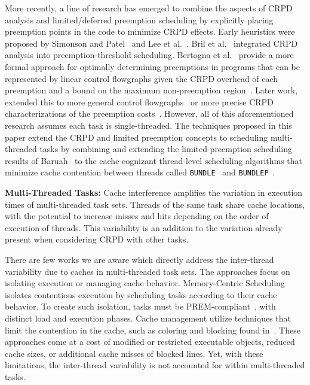 \documentclass[a4paper,UKenglish,cleveref,autoref,english]{lipics-v2019}
\newcommand{\bundlep}{\texttt{BUNDLEP}}
\newcommand{\bundle}{\texttt{BUNDLE}}
\begin{document}
More recently, a line of research has emerged to combine the aspects
of CRPD analysis and limited/deferred preemption scheduling by
explicitly placing preemption points in the code to minimize CRPD
effects.  Early heuristics were proposed by Simonson and
Patel~\cite{Simonson:1995} and Lee et al.~\cite{Lee:1998}.  Bril et
al.~\cite{Bril:2017} integrated CRPD analysis into preemption-threshold
scheduling.  Bertogna et al.~\cite{Bertogna:2011} provide a more formal
approach for optimally determining preemptions in programs that can be
represented by linear control flowgraphs given the CRPD overhead of
each preemption and a bound on the maximum non-preemption
region~\cite{Baruah:2005}. Later work, extended this to more general
control flowgraphs~\cite{Peng:2014} or more precise CRPD
characterizations of the preemption costs~\cite{Cavicchio:2015}.
However, all of this aforementioned research assumes each task is
single-threaded.  The techniques proposed in this paper extend
the CRPD and limited preemption concepts to scheduling multi-threaded
tasks by combining and extending the limited-preemption scheduling
results of Baruah~\cite{Baruah:2005} to the cache-cognizant
thread-level scheduling algorithms that minimize cache contention
between threads called \bundle{}~\cite{Tessler:2016} and
\bundlep{}~\cite{Tessler:2018}.


\noindent
\textbf{Multi-Threaded Tasks:} Cache interference amplifies 
the variation in execution times of multi-threaded task sets. Threads
of the same task share cache locations, with the potential to increase
misses and hits depending on the order of execution of
threads. This variability is an addition to the variation already
present when considering CRPD with other tasks.

  There are few works we are aware which directly address the
inter-thread variability due to caches in multi-threaded task
sets. The approaches focus on isolating execution or managing cache
behavior. Memory-Centric Scheduling~\cite{Bak:2012} isolates
contentious execution by scheduling tasks according to their cache
behavior. To create such isolation, tasks must be
PREM-compliant~\cite{Pellizzoni:2011}, with distinct load and
execution phases. Cache management utilize techniques that limit the
contention in the cache, such as coloring and blocking found
in~\cite{Ward:2013}. These approaches come at a cost of modified or
restricted executable objects, reduced cache sizes, or additional
cache misses of blocked lines. Yet, with these limitations, the
inter-thread variability is not accounted for within multi-threaded
tasks. 
\end{document}
